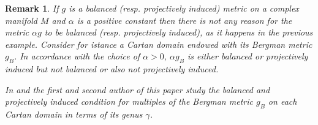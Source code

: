 \documentclass[11pt, reqno]{amsart}
\newtheorem{remar}[theor]{Remark}
\begin{document}
\begin{remar}\rm\label{remarmultiple}
If  $g$ is a balanced (resp. projectively induced) metric  on a complex manifold  $M$ and $\alpha$ is a positive constant  then there is not any reason for the metric
$\alpha g$
to be balanced (resp. projectively induced), as it happens in the previous example.  Consider for istance a Cartan domain endowed with its Bergman metric $g_B$. In accordance with the choice of $\alpha>0$, $\alpha g_B$ is either balanced or projectively induced but not balanced or also not projectively induced.  
 
  
In \cite{articwall} and
 \cite{cartanbalanced}
 the first and second author of this paper
study the balanced and projectively induced condition for multiples of the Bergman metric $g_B$ on each  Cartan domain in terms of its genus
$\gamma$.
\end{remar}
\end{document}
